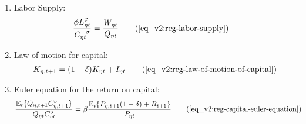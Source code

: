 \documentclass[../thesis.tex]{subfiles}
\begin{document}
{\begin{itemize}
\begin{enumerate}
\begin{comment}
		\begin{align}
			\frac{Q_{1t}}{Q_{2t}} &= \frac{\omega_{21}^{\omega_{21}} (1 -\omega_{21})^{1 -\omega_{21}}}{\omega_{11}^{\omega_{11}} (1 - \omega_{11})^{1 - \omega_{11}}} \tag{\ref{eq_v2:reg-total-expense-level-2}}
		\end{align}
	
\end{comment}
		
		\item Labor Supply:
			\begin{align}
				\frac{\phi L_{\eta t}^{\varphi}}{C_{\eta t}^{-\sigma}} &= \frac{W_{\eta t}}{Q_{\eta t}} \tag{\ref{eq_v2:reg-labor-supply}}
			\end{align}
		
		\item Law of motion for capital:
		\begin{align}
			K_{\eta,t+1} = (1 - \delta) K_{\eta t} + I_{\eta t} \tag{\ref{eq_v2:reg-law-of-motion-of-capital}}
		\end{align}		

		\item Euler equation for the return on capital:
		\begin{align}
			\frac{\mathbb{E}_{t} \{ Q_{\eta,t+1} C_{\eta,t+1}^{\sigma} \} }{ Q_{\eta t} C_{\eta t}^{\sigma} } &= \beta \frac{ \mathbb{E}_{t} \{ P_{\eta,t+1} (1 - \delta) + R_{t+1} \} }{P_{\eta t}} \tag{\ref{eq_v2:reg-capital-euler-equation}}
		\end{align}

		\begin{comment}

			\item Region 1 Euler equation for the bonds return:
			\begin{align}
				\frac{\mathbb{E}_{t} \left\{Q_{1, t+1} C_{1, t+1}^{\sigma} \right\}}{Q_{1t} C_{1t}^{\sigma}} &= \beta (1 + R_{t}) \tag{\ref{eq_v2:reg-capital-euler-equation}}
			\end{align}
			
			\item Euler equation for regional consumption:
			\begin{align}
				\frac{\mathbb{E}_{t} \left\{ Q_{1, t+1} C_{1, t+1}^{\sigma} \right\}}{Q_{1t} C_{1t}^{\sigma}} &= \frac{\mathbb{E}_{t} \left\{ Q_{2, t+1} C_{2, t+1}^{\sigma} \right\}}{Q_{2t} C_{2t}^{\sigma}} \tag{\ref{eq_v2:reg-bonds-euler-equation-2}}
			\end{align}
			
		\end{comment}
		

\end{enumerate}
\end{itemize}}
\end{document}
